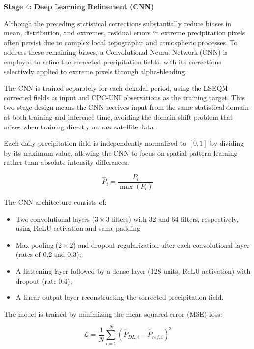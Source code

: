 \documentclass[11pt,a4paper]{article}
\providecommand{\tightlist}{\setlength{\itemsep}{0pt}\setlength{\parskip}{0pt}}
\begin{document}
\textbf{Stage 4: Deep Learning Refinement (CNN)}

Although the preceding statistical corrections substantially reduce
biases in mean, distribution, and extremes, residual errors in extreme
precipitation pixels often persist due to complex local topographic and
atmospheric processes. To address these remaining biases, a
Convolutional Neural Network (CNN) is employed to refine the corrected
precipitation fields, with its corrections selectively applied to
extreme pixels through alpha-blending.

The CNN is trained separately for each dekadal period, using the
LSEQM-corrected fields as input and CPC-UNI observations as the training
target. This two-stage design means the CNN receives input from the same
statistical domain at both training and inference time, avoiding the
domain shift problem that arises when training directly on raw satellite
data \cite{ref9}.

Each daily precipitation field is independently normalized to \([0, 1]\)
by dividing by its maximum value, allowing the CNN to focus on spatial
pattern learning rather than absolute intensity differences:

\begin{equation}\hat{P}_{i} = \frac{P_{i}}{\max(P_{i})}\end{equation}

The CNN architecture consists of:

\begin{itemize}
\tightlist
\item
  Two convolutional layers (\(3 \times 3\) filters) with 32 and 64
  filters, respectively, using ReLU activation and same-padding;
\item
  Max pooling (\(2 \times 2\)) and dropout regularization after each
  convolutional layer (rates of 0.2 and 0.3);
\item
  A flattening layer followed by a dense layer (128 units, ReLU
  activation) with dropout (rate 0.4);
\item
  A linear output layer reconstructing the corrected precipitation
  field.
\end{itemize}

The model is trained by minimizing the mean squared error (MSE) loss:

\begin{equation}\mathcal{L} = \frac{1}{N} \sum_{i=1}^{N} \left( \hat{P}_{DL,i} - \hat{P}_{ref,i} \right)^2\end{equation}
\end{document}
